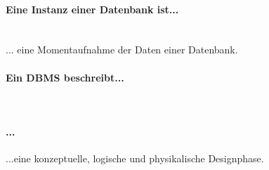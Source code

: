 
\paragraph{Eine Instanz einer Datenbank ist...} \\
... eine Momentaufnahme der Daten einer Datenbank. 
\paragraph{Ein DBMS beschreibt...} \\
\paragraph{...} ...eine konzeptuelle, logische und physikalische Designphase.
